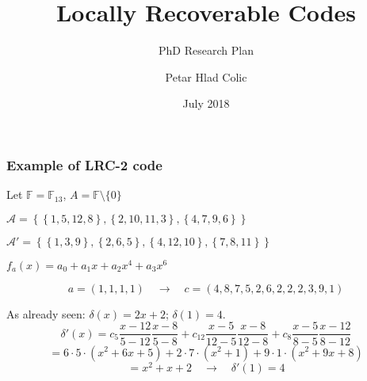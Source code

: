 \documentclass[envcountsect]{beamer}
\title{Locally Recoverable Codes}
\subtitle{PhD Research Plan}
\author{Petar Hlad Colic}
\institute{Department of Network Engineering \\ Universitat Polit\`ecnica de Catalunya}
\date{July 2018}
\newcommand{\FF}{\mathbb{F}}
\begin{document}
    \frame{\titlepage}
    
    \frame{\tableofcontents}
    
    
    
    
    
    
    
    
    
    \begin{frame}
        \frametitle{Example of LRC-2 code}
        
        Let $\FF = \FF_{13}$, $A = \FF \setminus \{0\}$
        
        $\mathcal{A} = \left\lbrace  \left\lbrace 1, 5, 12 , 8 \right\rbrace, \left\lbrace 2 , 10 , 11 , 3 \right\rbrace , \left\lbrace 4 , 7 , 9 , 6 \right\rbrace \right\rbrace$
        
        $\mathcal{A'} = \left\lbrace  \left\lbrace 1 , 3 , 9 \right\rbrace, \left\lbrace 2 , 6 , 5 \right\rbrace , \left\lbrace 4 , 12 , 10 \right\rbrace , \left\lbrace 7 , 8 , 11 \right\rbrace \right\rbrace$
        
        $f_a(x) = a_0 + a_1 x + a_2 x^4 + a_3 x^6$
        
        $$a = (1,1,1,1) \quad \longrightarrow \quad c = (4,8,7,5,2,6,2,2,2,3,9,1)$$
        
        As already seen: $\delta(x) = 2x + 2$; $\delta(1)=4$.
        $$\delta ' (x) = c_5 \frac{x-12}{5-12}\frac{x-8}{5-8} + c_{12} \frac{x-5}{12-5}\frac{x-8}{12-8} + c_8 \frac{x-5}{8-5}\frac{x-12}{8-12}$$
        $$ = 6 \cdot 5 \cdot (x^2 + 6x + 5) + 2 \cdot 7 \cdot (x^2 + 1) + 9 \cdot 1 \cdot (x^2 + 9x + 8)$$
        $$ = x^2 + x + 2 \quad \longrightarrow \quad \delta ' (1) = 4$$
    \end{frame}        
    
    
   
    
    
\end{document}
